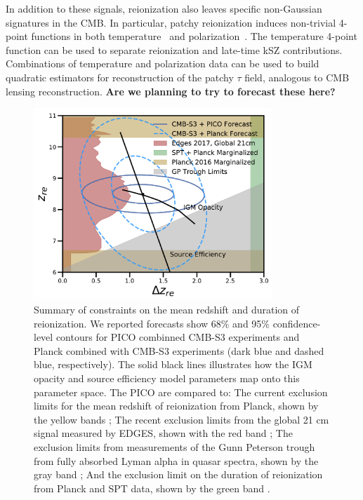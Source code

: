 \documentclass[PICOReport.tex]{subfiles}
\begin{document}
In addition to these signals, reionization also leaves specific non-Gaussian signatures in the CMB.  In particular, patchy reionization induces non-trivial 4-point functions in both temperature~\citep{SmithFerraro2017} and polarization~\citep{DvorkinSmith2008}.  The temperature 4-point function can be used to separate reionization and late-time kSZ contributions.  Combinations of temperature and polarization data can be used to build quadratic estimators for reconstruction of the patchy $\tau$ field, analogous to CMB lensing reconstruction.  \textbf{Are we planning to try to forecast these here?}

\begin{figure}
\includegraphics[width=0.8\textwidth]{images/Reionization_Contours_zbar_delz_PICO_NEW.pdf}
\caption{\label{fig:ReionizationPICO} Summary of constraints on the mean redshift and duration of reionization. We reported forecasts show 68\% and 95\% confidence-level contours for PICO combinned CMB-S3 experiments and Planck combined with CMB-S3 experiments (dark blue and dashed blue, respectively). The solid black lines illustrates how the IGM opacity and source efficiency model parameters map onto this parameter space. The PICO are compared to: The current exclusion limits for the mean redshift of reionization from Planck, shown by the yellow bands \citealp{planck2018:parameters}; The recent exclusion limits from the global 21 cm signal measured by EDGES, shown with the red band \citealp{edges2017}; The exclusion limits from measurements of the Gunn Peterson trough from fully absorbed Lyman alpha in quasar spectra, shown by the gray band \citealp{Fan2006}; And the exclusion limit on the duration of reionization from Planck and SPT data, shown by the green band \citealp{planck_reio:2016}.}
\end{figure}
\end{document}
